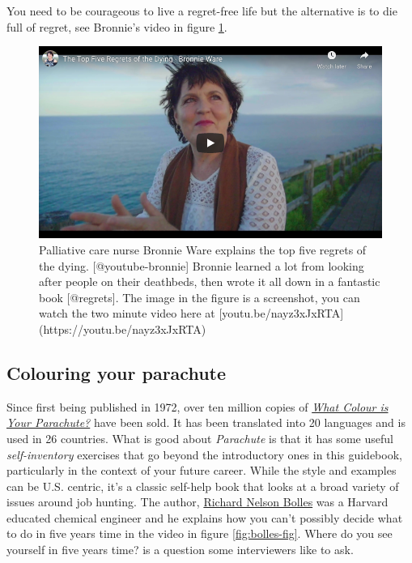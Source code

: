 \documentclass[
]{book}
\begin{document}
You need to be courageous to live a regret-free life but the alternative is to die full of regret, see Bronnie's video in figure \ref{fig:bronnie-fig}.

\begin{figure}

{\centering \includegraphics[width=0.99\linewidth]{images/youtube-bronnie} 

}

\caption{Palliative care nurse Bronnie Ware explains the top five regrets of the dying. [@youtube-bronnie] Bronnie learned a lot from looking after people on their deathbeds, then wrote it all down in a fantastic book [@regrets]. The image in the figure is a screenshot, you can watch the two minute video here at [youtu.be/nayz3xJxRTA](https://youtu.be/nayz3xJxRTA) }\label{fig:bronnie-fig}
\end{figure}

\hypertarget{parachute}{%
\subsection{Colouring your parachute}\label{parachute}}

Since first being published in 1972, over ten million copies of \emph{\href{https://en.wikipedia.org/wiki/What_Color_is_Your_Parachute\%3F}{What Colour is Your Parachute?}} have been sold. It has been translated into 20 languages and is used in 26 countries. What is good about \emph{Parachute} is that it has some useful \emph{self-inventory} exercises that go beyond the introductory ones in this guidebook, particularly in the context of your future career. While the style and examples can be U.S. centric, it's a classic self-help book that looks at a broad variety of issues around job hunting. The author, \href{https://en.wikipedia.org/wiki/Richard_Nelson_Bolles}{Richard Nelson Bolles} was a Harvard educated chemical engineer and he explains how you can't possibly decide what to do in five years time in the video in figure \ref{fig:bolles-fig}. Where do you see yourself in five years time? is a question some interviewers like to ask.
\end{document}
